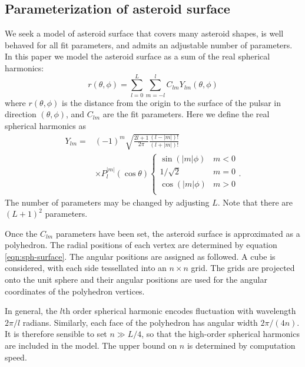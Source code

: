 \documentclass[aps,twocolumn,secnumarabic,balancelastpage,amsmath,amssymb,nofootinbib,floatfix]{revtex4-1}
\begin{document}
\subsection{Parameterization of asteroid surface}
We seek a model of asteroid surface that covers many asteroid shapes, is well behaved for all fit parameters, and admits an adjustable number of parameters. In this paper we model the asteroid surface as a sum of the real spherical harmonics:
\begin{equation}
    r(\theta, \phi) = \sum_{l=0}^L\sum_{m=-l}^l C_{lm} Y_{lm}(\theta, \phi)
    \label{eqn:sph-surface}
\end{equation}
where $r(\theta, \phi)$ is the distance from the origin to the surface of the pulsar in direction $(\theta, \phi)$, and $C_{lm}$ are the fit parameters. Here we define the real spherical harmonics as 
\begin{equation}
    \begin{aligned}
        Y_{lm} = &(-1)^m\sqrt{\frac{2l + 1}{2\pi}\frac{(l-|m|)!}{(l+|m|)!}}\\
        &\times P_l^{|m|}(\cos\theta)\begin{cases}
            \sin(|m|\phi)& m < 0\\
            1/\sqrt{2}& m = 0\\
            \cos(|m|\phi)& m > 0\\
        \end{cases}.
        \label{eqn:spherical-harmonics}
    \end{aligned}
\end{equation}
The number of parameters may be changed by adjusting $L$. Note that there are $(L+1)^2$ parameters.


Once the $C_{lm}$ parameters have been set, the asteroid surface is approximated as a polyhedron. The radial positions of each vertex are determined by equation \ref{eqn:sph-surface}. The angular positions are assigned as followed. A cube is considered, with each side tessellated into an $n\times n$ grid. The grids are projected onto the unit sphere and their angular positions are used for the angular coordinates of the polyhedron vertices.

In general, the $l$th order spherical harmonic encodes fluctuation with wavelength $2\pi / l$ radians. Similarly, each face of the polyhedron has angular width $2\pi / (4n)$. It is therefore sensible to set $n \gg L/4$, so that the high-order spherical harmonics are included in the model. The upper bound on $n$ is determined by computation speed.
\end{document}
